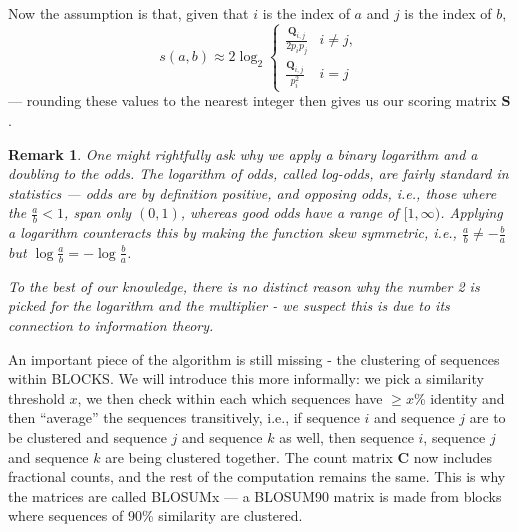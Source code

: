 \documentclass{article}
\newtheorem{remark}{Remark}
\begin{document}
Now the assumption is that, given that $i$ is the index of $a$ and $j$ is the index of $b$,
\begin{equation*}
	s(a, b) \approx	2 \log_2 \begin{cases}
		\frac{\mathbf Q_{i, j}}{2p_ip_j} & i \ne j, \\
		\frac{\mathbf Q_{i, j}}{p_i^2} & i = j
	\end{cases}
\end{equation*}
--- rounding these values to the nearest integer then gives us our scoring matrix $\mathbf S$.

\begin{remark}
	One might rightfully ask why we apply a binary logarithm and a doubling to the odds.
	The logarithm of odds, called \emph{log-odds}, are fairly standard in
	statistics --- odds are by definition positive, and opposing odds, i.e.,
	those where the $\frac a b < 1$, span only
	$(0, 1)$, whereas good odds have a range of $[1, \infty)$. Applying a logarithm counteracts
	this by making the function skew symmetric, i.e., $\frac a b 
	\ne -\frac b a$ but $\log \frac a b = - \log \frac b a $.
	
	To the best of our knowledge, there is no distinct reason why the number 2 is picked for the logarithm and the multiplier - we suspect this is due to its connection to information theory.
\end{remark}

An important piece of the algorithm is still missing - the clustering of sequences within BLOCKS.
We will introduce this more informally: we pick a similarity threshold $x$, we
then check within each  which sequences have $\ge x$\% identity and
then ``average'' the sequences transitively, i.e., if sequence $i$ and
sequence $j$ are to be clustered and sequence $j$ and sequence $k$ as well,
then sequence $i$, sequence $j$ and sequence $k$ are being clustered together.
The count matrix $\mathbf C$ now includes fractional counts, and the rest of the computation remains the same.
This is why the matrices are called BLOSUMx --- a BLOSUM90 matrix is made from blocks where sequences 
of 90\% similarity are clustered.
\end{document}
